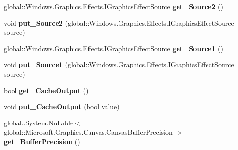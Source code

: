 \begin{DoxyCompactItemize}
global\+::\+Windows.\+Graphics.\+Effects.\+I\+Graphics\+Effect\+Source {\bfseries get\+\_\+\+Source2} ()
\item 
\mbox{\label{class_microsoft_1_1_graphics_1_1_canvas_1_1_effects_1_1_cross_fade_effect_a03f909bfef26ae588f520b5c6f561b89}} 
void {\bfseries put\+\_\+\+Source2} (global\+::\+Windows.\+Graphics.\+Effects.\+I\+Graphics\+Effect\+Source source)
\item 
\mbox{\label{class_microsoft_1_1_graphics_1_1_canvas_1_1_effects_1_1_cross_fade_effect_a515cb86c3b146b49a043c5a2f2fa0e34}} 
global\+::\+Windows.\+Graphics.\+Effects.\+I\+Graphics\+Effect\+Source {\bfseries get\+\_\+\+Source1} ()
\item 
\mbox{\label{class_microsoft_1_1_graphics_1_1_canvas_1_1_effects_1_1_cross_fade_effect_a72eb46d22afb55188148751eda6335e6}} 
void {\bfseries put\+\_\+\+Source1} (global\+::\+Windows.\+Graphics.\+Effects.\+I\+Graphics\+Effect\+Source source)
\item 
\mbox{\label{class_microsoft_1_1_graphics_1_1_canvas_1_1_effects_1_1_cross_fade_effect_a8e3589682f0d148492f35236f8ccfba7}} 
bool {\bfseries get\+\_\+\+Cache\+Output} ()
\item 
\mbox{\label{class_microsoft_1_1_graphics_1_1_canvas_1_1_effects_1_1_cross_fade_effect_a8332e6ad0fb1e1aceda5417f290ce62f}} 
void {\bfseries put\+\_\+\+Cache\+Output} (bool value)
\item 
\mbox{\label{class_microsoft_1_1_graphics_1_1_canvas_1_1_effects_1_1_cross_fade_effect_a0ca90f8254840e1cd6acb7017be2d7aa}} 
global\+::\+System.\+Nullable$<$ global\+::\+Microsoft.\+Graphics.\+Canvas.\+Canvas\+Buffer\+Precision $>$ {\bfseries get\+\_\+\+Buffer\+Precision} ()
\item 
\mbox{\label{class_microsoft_1_1_graphics_1_1_canvas_1_1_effects_1_1_cross_fade_effect_ad2ee508e3e5be9ddc1bdb048194edcf4}} 

\end{DoxyCompactItemize}
